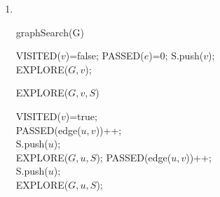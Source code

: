 \documentclass[12pt,a4paper]{article}
\makeatletter
\newtheorem*{solution}{Solution}
\theoremstyle{definition}
\renewenvironment{solution}[1][Solution] {\par\pushQED{\qed}\normalfont\topsep6\p@\@plus6\p@\relax\trivlist\item[\hskip\labelsep\bfseries#1\@addpunct{.}]\ignorespaces}{\popQED\endtrivlist\@endpefalse} \makeatother
\makeatother
\begin{document}
\begin{enumerate}
\begin{solution}
\ \\
\begin{minipage}[t]{0.47\textwidth}
\begin{algorithm}[H]
	\caption{graphSearch(G)}
	{	
		VISITED($v$)=false;
	}
	{	
		PASSED($e$)=0;
	}
	{
		{
			S.push($v$);\\
			EXPLORE($G,v$);
		}
	}
\end{algorithm}
\end{minipage}
\hspace{2mm}
\begin{minipage}[t]{0.47\textwidth}
\begin{algorithm}[H]
	\caption{EXPLORE($G,v,S$)}
	VISITED($v$)=true;\\
	{
		{
			PASSED(edge($u,v$))++;\\
			S.push($u$);\\
			EXPLORE($G,u,S$);
		}
	}
	{
		{
			PASSED(edge($u,v$))++;\\
			S.push($u$);\\
			EXPLORE($G,u,S$);
		}
	}
	
\end{algorithm}
\end{minipage}
\end{solution}

\end{enumerate}

\end{document}
